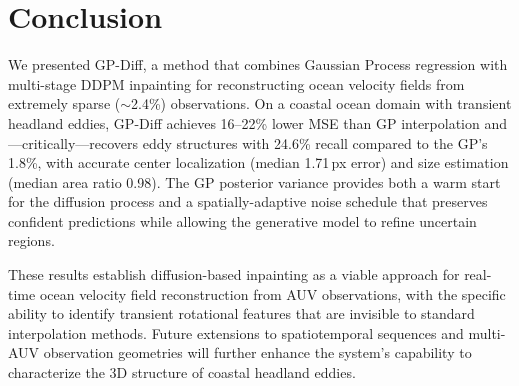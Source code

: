 \documentclass{article}
\begin{document}
\section{Conclusion}
\label{sec:conclusion}

We presented GP-Diff, a method that combines Gaussian Process regression with multi-stage DDPM inpainting for reconstructing ocean velocity fields from extremely sparse ($\sim$2.4\%) observations. On a coastal ocean domain with transient headland eddies, GP-Diff achieves 16--22\% lower MSE than GP interpolation and---critically---recovers eddy structures with 24.6\% recall compared to the GP's 1.8\%, with accurate center localization (median 1.71\,px error) and size estimation (median area ratio 0.98). The GP posterior variance provides both a warm start for the diffusion process and a spatially-adaptive noise schedule that preserves confident predictions while allowing the generative model to refine uncertain regions.

These results establish diffusion-based inpainting as a viable approach for real-time ocean velocity field reconstruction from AUV observations, with the specific ability to identify transient rotational features that are invisible to standard interpolation methods. Future extensions to spatiotemporal sequences and multi-AUV observation geometries will further enhance the system's capability to characterize the 3D structure of coastal headland eddies.

\end{document}
